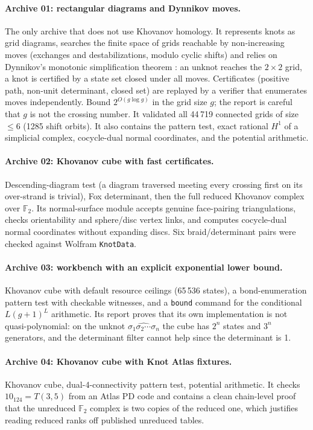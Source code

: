 \documentclass[11pt]{article}
\theoremstyle{remark}
\newcommand{\F}{\mathbb{F}_2}
\newcommand{\code}[1]{\texttt{#1}}
\begin{document}
\paragraph{Archive 01: rectangular diagrams and Dynnikov moves.}
The only archive that does not use Khovanov homology. It represents knots as
grid diagrams, searches the finite space of grids reachable by
non-increasing moves (exchanges and destabilizations, modulo cyclic shifts)
and relies on Dynnikov's monotonic simplification theorem
\cite{dynnikov}: an unknot reaches the $2\times2$ grid, a knot is certified by
a state set closed under all moves. Certificates (positive path, non-unit
determinant, closed set) are replayed by a verifier that enumerates moves
independently. Bound $2^{O(g\log g)}$ in the grid size $g$; the report is
careful that $g$ is not the crossing number. It validated all 44\,719
connected grids of size $\le6$ (1285 shift orbits). It also contains the
pattern test, exact rational $H^1$ of a simplicial complex, cocycle-dual
normal coordinates, and the potential arithmetic.

\paragraph{Archive 02: Khovanov cube with fast certificates.}
Descending-diagram test (a diagram traversed meeting every crossing first on
its over-strand is trivial), Fox determinant, then the full reduced Khovanov
complex over $\F$. Its normal-surface module accepts genuine face-pairing
triangulations, checks orientability and sphere/disc vertex links, and
computes cocycle-dual normal coordinates without expanding discs. Six
braid/determinant pairs were checked against Wolfram \code{KnotData}.

\paragraph{Archive 03: workbench with an explicit exponential lower bound.}
Khovanov cube with default resource ceilings (65\,536 states), a
bond-enumeration pattern test with checkable witnesses, and a
\code{bound} command for the conditional $L(g+1)^L$ arithmetic. Its report
proves that its own implementation is not quasi-polynomial: on the unknot
$\widehat{\sigma_1\sigma_2\cdots\sigma_n}$ the cube has $2^n$ states and
$3^n$ generators, and the determinant filter cannot help since the
determinant is 1.

\paragraph{Archive 04: Khovanov cube with Knot Atlas fixtures.}
Khovanov cube, dual-4-connectivity pattern test, potential arithmetic. It
checks $10_{124}=T(3,5)$ from an Atlas PD code and contains a clean
chain-level proof that the unreduced $\F$ complex is two copies of the
reduced one, which justifies reading reduced ranks off published unreduced
tables.
\end{document}
